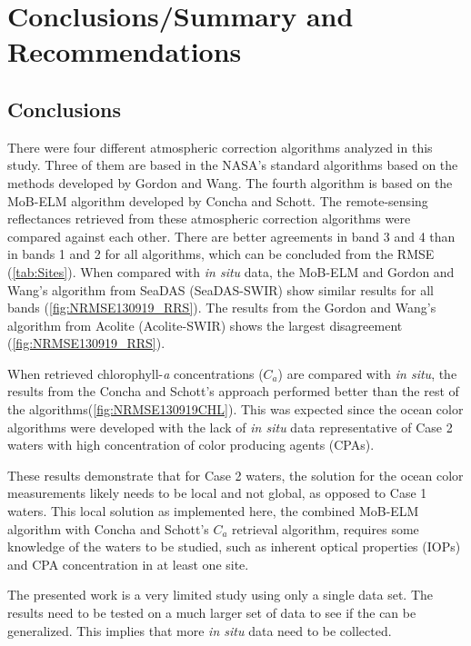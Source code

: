 \chapter{Conclusions/Summary and Recommendations}
\section{Conclusions}

\label{sec:conc}  %
There were four different atmospheric correction algorithms analyzed in this study. Three of them are based in the NASA's standard algorithms based on the methods developed by Gordon and Wang\cite{Gordon:1994}. The fourth algorithm is based on the MoB-ELM algorithm developed by Concha and Schott\cite{Concha2014SPIE}. The remote-sensing reflectances retrieved from these atmospheric correction algorithms were compared against each other. There are better agreements in band 3 and 4 than in bands 1 and 2 for all algorithms, which can be concluded from the RMSE (\autoref{tab:Sites}). When compared with {\it in situ} data, the MoB-ELM and Gordon and Wang's algorithm from SeaDAS (SeaDAS-SWIR) show similar results for all bands (\autoref{fig:NRMSE130919_RRS}). The results from the Gordon and Wang's algorithm from Acolite (Acolite-SWIR) shows the largest disagreement (\autoref{fig:NRMSE130919_RRS}).

When retrieved chlorophyll-{\it a} concentrations ($C_a$) are compared with {\it in situ}, the results from the Concha and Schott's approach performed better than the rest of the algorithms(\autoref{fig:NRMSE130919CHL}). This was expected since the ocean color algorithms were developed with the lack of {\it in situ} data representative of Case 2 waters with high concentration of color producing agents (CPAs).

These results demonstrate that for Case 2 waters, the solution for the ocean color measurements likely needs to be local and not global, as opposed to Case 1 waters. This local solution as implemented here, the combined MoB-ELM algorithm with Concha and Schott's $C_a$ retrieval algorithm, requires some knowledge of the waters to be studied, such as inherent optical properties (IOPs) and CPA concentration in at least one site.

The presented work is a very limited study using only a single data set. The results need to be tested on a much larger set of data to see if the can be generalized. This implies that more {\it in situ} data need to be collected.

